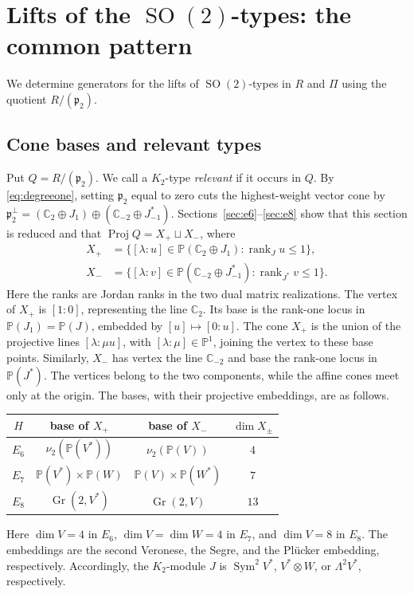 \documentclass[11pt]{article}
\newcommand{\C}{\mathbb C}
\newcommand{\PP}{\mathbb P}
\newcommand{\Gr}{\operatorname{Gr}}
\newcommand{\Sym}{\operatorname{Sym}}
\newcommand{\SO}{\operatorname{SO}}
\newcommand{\fp}{\mathfrak p}
\theoremstyle{definition}
\numberwithin{equation}{section}
\begin{document}
\section{Lifts of the \texorpdfstring{$\SO(2)$}{SO(2)}-types: the common pattern}\label{sec:forward}
We determine generators for the lifts of $\SO(2)$-types in $R$ and
$\Pi$ using the quotient $R/(\fp_2)$.

\subsection{Cone bases and relevant types}
Put $Q=R/(\fp_2)$. We call a $K_2$-type \emph{relevant} if it occurs
in $Q$. By \eqref{eq:degreeone}, setting $\fp_2$ equal to zero cuts
the highest-weight vector cone by
$\fp_2^\perp=(\C_2\oplus J_1)\oplus(\C_{-2}\oplus J^*_{-1})$.
Sections~\ref{sec:e6}--\ref{sec:e8} show that this section is reduced
and that $\operatorname{Proj}Q=X_+\sqcup X_-$, where
\[
 \begin{aligned}
 X_+&=\{[\lambda:u]\in\PP(\C_2\oplus J_1):
                         \operatorname{rank}_J u\leq1\},\\
 X_-&=\{[\lambda:v]\in\PP(\C_{-2}\oplus J^*_{-1}):
                         \operatorname{rank}_{J^*}v\leq1\}.
 \end{aligned}
\]
Here the ranks are Jordan ranks in the two dual matrix realizations.
The vertex of $X_+$ is $[1:0]$, representing the line $\C_2$.
Its base is the rank-one locus in $\PP(J_1)=\PP(J)$, embedded by
$[u]\mapsto[0:u]$. The cone $X_+$ is the union of the projective lines
$[\lambda:\mu u]$, with $[\lambda:\mu]\in\PP^1$, joining the vertex
to these base points. Similarly, $X_-$ has vertex the line $\C_{-2}$
and base the rank-one locus in $\PP(J^*)$. The vertices belong to the
two components, while the affine cones meet only at the origin.
The bases, with their projective embeddings, are as follows.
\begin{center}
\begin{tabular}{c c c c}
\toprule
$H$ & base of $X_+$ & base of $X_-$ & $\dim X_\pm$ \\
\midrule
$E_6$ & $\nu_2(\PP(V^*))$ & $\nu_2(\PP(V))$ & $4$ \\
$E_7$ & $\PP(V^*)\times\PP(W)$ & $\PP(V)\times\PP(W^*)$ & $7$ \\
$E_8$ & $\Gr(2,V^*)$ & $\Gr(2,V)$ & $13$ \\
\bottomrule
\end{tabular}
\end{center}
Here $\dim V=4$ in $E_6$, $\dim V=\dim W=4$ in $E_7$, and
$\dim V=8$ in $E_8$. The embeddings are the second Veronese, the Segre,
and the Pl\"ucker embedding, respectively. Accordingly, the $K_2$-module
$J$ is $\Sym^2V^*$, $V^*\otimes W$, or $\Lambda^2V^*$, respectively.
\end{document}
